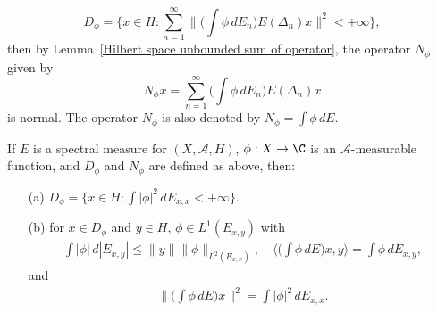 \[D_\phi=\{x\in H:\sum_{n=1}^{\infty}\Big\|\Big(\int\phi\,dE_n\Big)E(\Delta_n)x\Big\|^2<+\infty\},\]
then by Lemma~\ref{Hilbert space unbounded sum of operator}, the operator $N_\phi$ given by
\[N_\phi x=\sum_{n=1}^{\infty}\Big(\int\phi\,dE_n\Big)E(\Delta_n)x\]
is normal. The operator $N_\phi$ is also denoted by $N_\phi=\int\phi\,dE$.
\begin{theorem}\label{Hilbert space unbounded multiplication for spectral measure}
If $E$ is a spectral measure for $(X,\mathcal{A},H)$, $\phi:X\to\C$ is an $\mathcal{A}$-measurable function, and $D_\phi$ and $N_\phi$ are defined as above, then:
\begin{itemize}
\item[(a)] $D_\phi=\{x\in H:\int|\phi|^2\,dE_{x,x}<+\infty\}$.
\item[(b)] for $x\in D_\phi$ and $y\in H$, $\phi\in L^1(E_{x,y})$ with
\begin{align}\label{Hilbert space unbounded multiplication for spectral measure-1}
\int|\phi|\,d|E_{x,y}|\leq\|y\|\|\phi\|_{L^2(E_{x,x})},\quad \langle\Big(\int\phi\,dE\Big)x,y\rangle=\int\phi\,dE_{x,y},
\end{align}
and
\begin{align}\label{Hilbert space unbounded multiplication for spectral measure-2}
\Big\|\Big(\int\phi\,dE\Big)x\Big\|^2=\int|\phi|^2\,dE_{x,x}.
\end{align}
\end{itemize}
\end{theorem}
